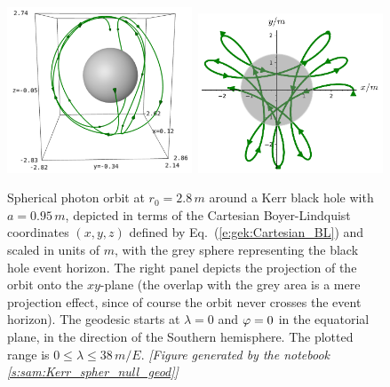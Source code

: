 \begin{figure}
\centerline{\includegraphics[width=0.49\textwidth]{gik_spher_3d_r_28.png}\
\includegraphics[width=0.49\textwidth]{gik_spher_3d_r_28_xy.pdf}}
\caption[]{\label{f:gik:spher_3d_r_28} \footnotesize
Spherical photon orbit at $r_0=2.8 \, m$ around a Kerr black hole with
$a=0.95\, m$, depicted in terms of the Cartesian Boyer-Lindquist coordinates
$(x,y,z)$ defined by Eq.~(\ref{e:gek:Cartesian_BL}) and scaled in units of $m$,
with the grey sphere representing the black hole event horizon.
The right panel depicts the projection of the orbit onto the $xy$-plane
(the overlap with the grey area is a mere projection effect, since of course
the orbit never crosses the event horizon).
The geodesic starts at $\lambda=0$ and $\varphi=0$ in the equatorial plane, in the direction
of the Southern hemisphere. The plotted range is $0 \leq \lambda \leq 38\, m/E$.
\textsl{[Figure generated by the notebook \ref{s:sam:Kerr_spher_null_geod}]}
}
\end{figure}

